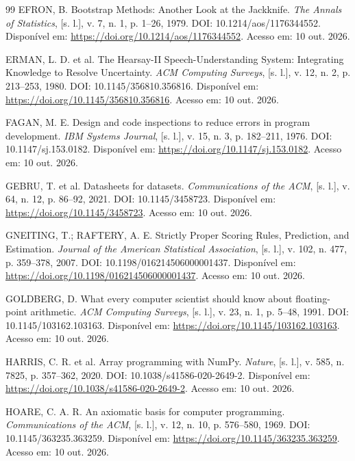 \documentclass[12pt,openany,oneside,a4paper,brazil,chapter=TITLE]{abntex2}
\begin{document}
\begin{SingleSpacing}
\begin{thebibliography}{99}
 EFRON, B. Bootstrap Methods: Another Look at the Jackknife. \textit{The Annals of Statistics}, [s. l.], v. 7, n. 1, p. 1--26, 1979. DOI: 10.1214/aos/1176344552. Disponível em: \url{https://doi.org/10.1214/aos/1176344552}. Acesso em: 10 out. 2026.

 ERMAN, L. D. et al. The Hearsay-II Speech-Understanding System: Integrating Knowledge to Resolve Uncertainty. \textit{ACM Computing Surveys}, [s. l.], v. 12, n. 2, p. 213--253, 1980. DOI: 10.1145/356810.356816. Disponível em: \url{https://doi.org/10.1145/356810.356816}. Acesso em: 10 out. 2026.

 FAGAN, M. E. Design and code inspections to reduce errors in program development. \textit{IBM Systems Journal}, [s. l.], v. 15, n. 3, p. 182--211, 1976. DOI: 10.1147/sj.153.0182. Disponível em: \url{https://doi.org/10.1147/sj.153.0182}. Acesso em: 10 out. 2026.

 GEBRU, T. et al. Datasheets for datasets. \textit{Communications of the ACM}, [s. l.], v. 64, n. 12, p. 86--92, 2021. DOI: 10.1145/3458723. Disponível em: \url{https://doi.org/10.1145/3458723}. Acesso em: 10 out. 2026.

 GNEITING, T.; RAFTERY, A. E. Strictly Proper Scoring Rules, Prediction, and Estimation. \textit{Journal of the American Statistical Association}, [s. l.], v. 102, n. 477, p. 359--378, 2007. DOI: 10.1198/016214506000001437. Disponível em: \url{https://doi.org/10.1198/016214506000001437}. Acesso em: 10 out. 2026.

 GOLDBERG, D. What every computer scientist should know about floating-point arithmetic. \textit{ACM Computing Surveys}, [s. l.], v. 23, n. 1, p. 5--48, 1991. DOI: 10.1145/103162.103163. Disponível em: \url{https://doi.org/10.1145/103162.103163}. Acesso em: 10 out. 2026.

 HARRIS, C. R. et al. Array programming with NumPy. \textit{Nature}, [s. l.], v. 585, n. 7825, p. 357--362, 2020. DOI: 10.1038/s41586-020-2649-2. Disponível em: \url{https://doi.org/10.1038/s41586-020-2649-2}. Acesso em: 10 out. 2026.

 HOARE, C. A. R. An axiomatic basis for computer programming. \textit{Communications of the ACM}, [s. l.], v. 12, n. 10, p. 576--580, 1969. DOI: 10.1145/363235.363259. Disponível em: \url{https://doi.org/10.1145/363235.363259}. Acesso em: 10 out. 2026.


\end{thebibliography}
\end{SingleSpacing}
\end{document}
